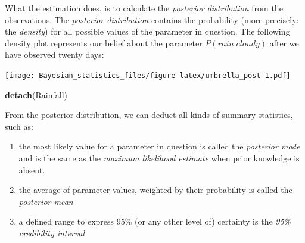 \documentclass[]{svmono}
\newenvironment{Shaded}{\begin{snugshade}}{\end{snugshade}}
\newcommand{\KeywordTok}[1]{\textcolor[rgb]{0.13,0.29,0.53}{\textbf{#1}}}
\newcommand{\DataTypeTok}[1]{\textcolor[rgb]{0.13,0.29,0.53}{#1}}
\newcommand{\DecValTok}[1]{\textcolor[rgb]{0.00,0.00,0.81}{#1}}
\newcommand{\StringTok}[1]{\textcolor[rgb]{0.31,0.60,0.02}{#1}}
\newcommand{\OperatorTok}[1]{\textcolor[rgb]{0.81,0.36,0.00}{\textbf{#1}}}
\newcommand{\NormalTok}[1]{#1}
\providecommand{\tightlist}{%
  \setlength{\itemsep}{0pt}\setlength{\parskip}{0pt}}
\theoremstyle{definition}
\theoremstyle{definition}
\theoremstyle{definition}
\theoremstyle{remark}
\begin{document}
What the estimation does, is to calculate the \emph{posterior
distribution} from the observations. The \emph{posterior distribution}
contains the probability (more precisely: the \emph{density}) for all
possible values of the parameter in question. The following density plot
represents our belief about the parameter \(P(rain|cloudy)\) after we
have observed twenty days:

\begin{Shaded}
\end{Shaded}

\texttt{[image: Bayesian\_statistics\_files/figure-latex/umbrella\_post-1.pdf]}

\begin{Shaded}
\begin{Highlighting}[]
\KeywordTok{detach}\NormalTok{(Rainfall)}
\end{Highlighting}
\end{Shaded}

From the posterior distribution, we can deduct all kinds of summary
statistics, such as:

\begin{enumerate}
\def\labelenumi{\arabic{enumi}.}
\tightlist
\item
  the most likely value for a parameter in question is called the
  \emph{posterior mode} and is the same as the \emph{maximum likelihood
  estimate} when prior knowledge is absent.
\item
  the average of parameter values, weighted by their probability is
  called the \emph{posterior mean}
\item
  a defined range to express 95\% (or any other level of) certainty is
  the \emph{95\% credibility interval}
\end{enumerate}
\end{document}
